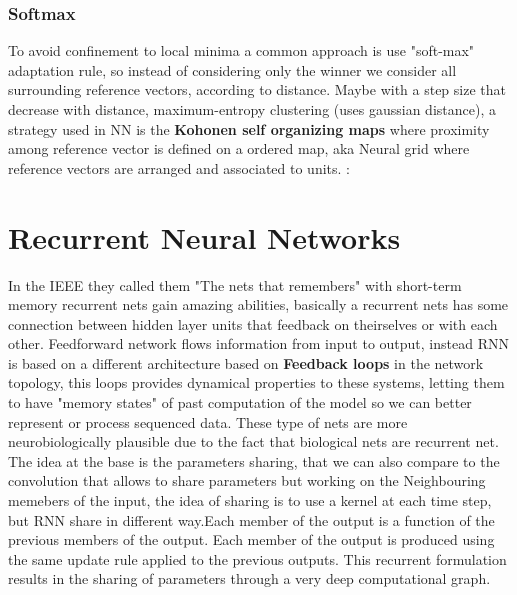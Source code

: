 \documentclass[12pt]{book}
\begin{document}
\subsubsection{Softmax}
To avoid confinement to local minima a common approach is use "soft-max" adaptation rule, so instead of considering only the winner we consider all surrounding reference vectors, according to distance. Maybe with a step size that decrease with distance, maximum-entropy clustering (uses gaussian distance), a strategy used in NN is the \textbf{Kohonen self organizing maps} where proximity among reference vector is defined on a ordered map, aka Neural grid where reference vectors are arranged and associated to units. 
:\section{Recurrent Neural Networks}
In the IEEE they called them "The nets that remembers" with short-term memory recurrent nets gain amazing abilities, basically a recurrent nets has some connection between hidden layer units that feedback on theirselves or with each other. Feedforward network flows information from input to output, instead RNN is based on a different architecture based on \textbf{Feedback loops} in the network topology, this loops provides dynamical properties to these systems, letting them to have "memory states" of past computation of the model so we can better represent or process sequenced data. These type of nets are more neurobiologically plausible due to the fact that biological nets are recurrent net.\newline
The idea at the base is the parameters sharing, that we can also compare to the convolution that allows to share parameters but working on the Neighbouring memebers of the input, the idea of sharing is to use a kernel at each time step, but RNN share in different way.Each member of the output is a function of the previous members of the output. Each member of the output is produced using the same update rule applied to the previous outputs. This recurrent formulation results in the sharing of parameters through a very deep computational graph.
\end{document}
